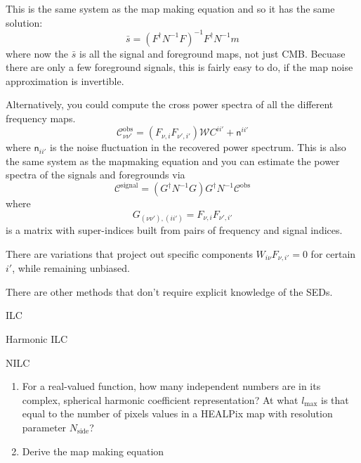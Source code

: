 This is the same system as the map making equation and so it has the same solution:
\begin{equation}
  \bar s = (F^\dag N^{-1}F)^{-1} F^\dag N^{-1} m
\end{equation}
where now the $\bar s$ is all the signal and foreground maps, not just CMB.  Becuase there are only a few foreground signals, this is fairly easy to do, if the map noise approximation is invertible.

Alternatively, you could compute the cross power spectra of all the different frequency maps.
\begin{equation}
  \mathcal{C}^\textrm{obs}_{\nu \nu'}  = (F_{\nu,i} F_{\nu',i'}) \mathcal{W}  C^{ii'} + \mathsf{n}^{ii'} 
\end{equation}
where $\mathsf{n}_{ii'}$ is the noise fluctuation in the recovered power spectrum.  This is also the same system as the mapmaking equation and you can estimate the power spectra of the signals and foregrounds via
\begin{equation}
  \mathcal{C}^\textrm{signal} = (G^\dag N^{-1}  G) G^\dag N^{-1} \mathcal{C}^\textrm{obs}
\end{equation}
where
\begin{equation}
  G_{(\nu \nu'),(ii')} = F_{\nu,i} F_{\nu',i'}
\end{equation}
is a matrix with super-indices built from pairs of frequency and signal indices.

There are variations that project out specific components $W_{i\nu} F_{\nu, i'} = 0$ for certain $i'$, while remaining unbiased.

There are other methods that don't require explicit knowledge of the SEDs.

ILC

Harmonic ILC

NILC

\exercises

\begin{enumerate}
\item For a real-valued function, how many independent numbers are in its complex, spherical harmonic coefficient representation?  At what $l_\textrm{max}$ is that equal to the number of pixels values in a HEALPix map with resolution parameter $N_\textrm{side}$?
  
\item Derive the map making equation
\end{enumerate}



